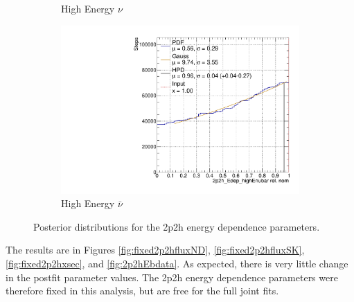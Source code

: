 \begin{figure}
\begin{subfigure}{.48\textwidth}
  \caption{High Energy $\nu$}
\end{subfigure}
\begin{subfigure}{.48\textwidth}
  \centering
  \includegraphics[width=0.73\linewidth]{figs/2p2h_Edep_highEnubar.pdf}
  \caption{High Energy $\bar{\nu}$}
\end{subfigure}
\caption{Posterior distributions for the 2p2h energy dependence parameters.}
\label{fig:2p2hEdepdist}
\end{figure}

The results are in Figures \ref{fig:fixed2p2hfluxND}, \ref{fig:fixed2p2hfluxSK}, \ref{fig:fixed2p2hxsec}, and \ref{fig:2p2hEbdata}. As expected, there is very little change in the postfit parameter values. The 2p2h energy dependence parameters were therefore fixed in this analysis, but are free for the full joint fits.

